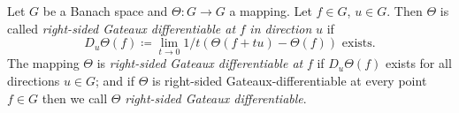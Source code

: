\begin{definition}\label{def:b2-2.2}
Let $G$ be a Banach space and $\Theta \colon G \to G$ a mapping.
Let $f \in G$, $u \in G$.
Then $\Theta$ is called \emph{right-sided Gateaux differentiable at} $f$ \emph{in direction} $u$ if
\begin{equation}\label{eq:b2-2.3}
D_{u}\Theta(f) \coloneq \lim_{t \to 0} 1/t(\Theta(f+tu) - \Theta(f)) \text{ exists.}
\end{equation}
The mapping $\Theta$ is \emph{right-sided Gateaux differentiable at} $f$ if\/ $D_{u}\Theta(f)$ exists for all directions $u \in G$; and if\/ $\Theta$ is right-sided Gateaux-differentiable at every point $f \in G$ then we call $\Theta$ \emph{right-sided Gateaux differentiable}.
\end{definition}

